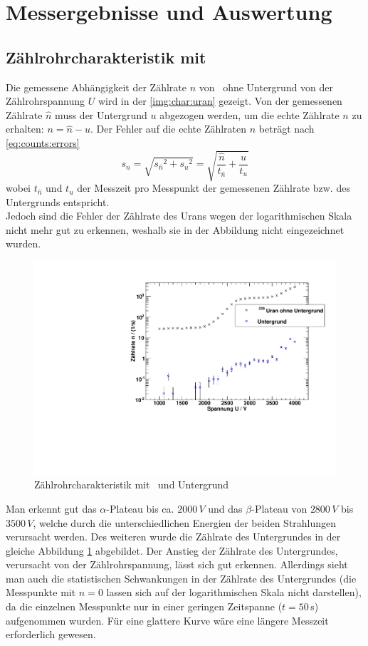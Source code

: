 \section{Messergebnisse und Auswertung}

\subsection{Zählrohrcharakteristik mit \uran}
\label{sub:eval:uran}
Die gemessene Abhängigkeit der Zählrate $n$ von \uran\, ohne Untergrund von der Zählrohrspannung $U$ wird in der \autoref{img:char:uran} gezeigt.
Von der gemessenen Zählrate $\hat{n}$ muss der Untergrund $u$ abgezogen werden, um die echte Zählrate $n$ zu erhalten: $n = \hat{n}- u$. Der 
Fehler auf die echte Zählraten $n$ beträgt nach \autoref{eq:counts:errors}
\begin{equation}
  s_n=\sqrt{s_{\hat{n}}{}^2+s_u{}^2}=\sqrt{\frac{\hat{n}}{t_{\hat{n}}}+\frac{u}{t_u}}
\end{equation}
wobei $t_{\hat{n}}$ und $t_u$ der Messzeit pro Messpunkt der gemessenen Zählrate bzw. des Untergrunds entspricht. \\
Jedoch sind die Fehler der Zählrate des Urans wegen der logarithmischen Skala nicht mehr gut zu erkennen, weshalb sie in der Abbildung nicht 
eingezeichnet wurden.
\begin{figure}[H]
\begin{center}
  \includegraphics[width=15cm]{../img/Uran238_Charakteristik.pdf}
  \caption[Zählrohrcharakteristik mit \uran]{Zählrohrcharakteristik mit \uran\, und Untergrund}
  \label{img:char:uran}
\end{center}
\end{figure}
Man erkennt gut das $\alpha$-Plateau bis ca. $2000\,V$ und das $\beta$-Plateau von $2800\,V$ bis $3500\,V$, welche durch die 
unterschiedlichen Energien der beiden Strahlungen verursacht werden. Des weiteren wurde die Zählrate des Untergrundes in der gleiche Abbildung 
\ref{img:char:uran} abgebildet. Der Anstieg der Zählrate des Untergrundes, verursacht von der Zählrohrspannung, lässt sich gut erkennen. Allerdings 
sieht man auch die statistischen Schwankungen in der Zählrate des Untergrundes (die Messpunkte mit $n = 0 $ lassen sich auf der logarithmischen 
Skala nicht darstellen), da die einzelnen Messpunkte nur in einer geringen Zeitspanne ($t=50\,$s) aufgenommen wurden. Für eine glattere Kurve wäre 
eine längere Messzeit erforderlich gewesen.
